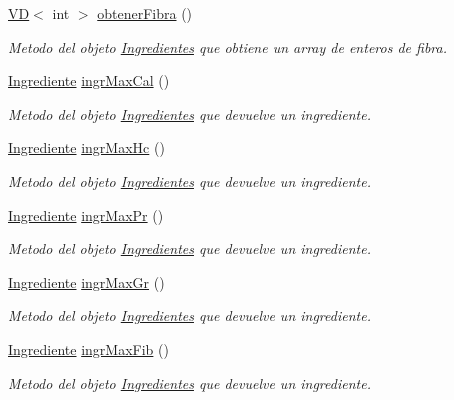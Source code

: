\begin{DoxyCompactItemize}
\hyperlink{classVD}{VD}$<$ int $>$ \hyperlink{classIngredientes_a89dcec2070874e3f288a6d46ab0b381a}{obtener\+Fibra} ()
\begin{DoxyCompactList}\small\item\em Metodo del objeto \hyperlink{classIngredientes}{Ingredientes} que obtiene un array de enteros de fibra. \end{DoxyCompactList}\item 
\hyperlink{classIngrediente}{Ingrediente} \hyperlink{classIngredientes_a8ee9b091d59c1e3a11659d8b8e79d3cc}{ingr\+Max\+Cal} ()
\begin{DoxyCompactList}\small\item\em Metodo del objeto \hyperlink{classIngredientes}{Ingredientes} que devuelve un ingrediente. \end{DoxyCompactList}\item 
\hyperlink{classIngrediente}{Ingrediente} \hyperlink{classIngredientes_a57b557e7f73e39a0e05d6d520e796645}{ingr\+Max\+Hc} ()
\begin{DoxyCompactList}\small\item\em Metodo del objeto \hyperlink{classIngredientes}{Ingredientes} que devuelve un ingrediente. \end{DoxyCompactList}\item 
\hyperlink{classIngrediente}{Ingrediente} \hyperlink{classIngredientes_a2dcc8c985b1ec665a017ada4448aaf96}{ingr\+Max\+Pr} ()
\begin{DoxyCompactList}\small\item\em Metodo del objeto \hyperlink{classIngredientes}{Ingredientes} que devuelve un ingrediente. \end{DoxyCompactList}\item 
\hyperlink{classIngrediente}{Ingrediente} \hyperlink{classIngredientes_a5584a2f2287749acc53c711ed615fe85}{ingr\+Max\+Gr} ()
\begin{DoxyCompactList}\small\item\em Metodo del objeto \hyperlink{classIngredientes}{Ingredientes} que devuelve un ingrediente. \end{DoxyCompactList}\item 
\hyperlink{classIngrediente}{Ingrediente} \hyperlink{classIngredientes_a284759d98988068f7214372c06b28f12}{ingr\+Max\+Fib} ()
\begin{DoxyCompactList}\small\item\em Metodo del objeto \hyperlink{classIngredientes}{Ingredientes} que devuelve un ingrediente. \end{DoxyCompactList}\item 

\end{DoxyCompactItemize}
